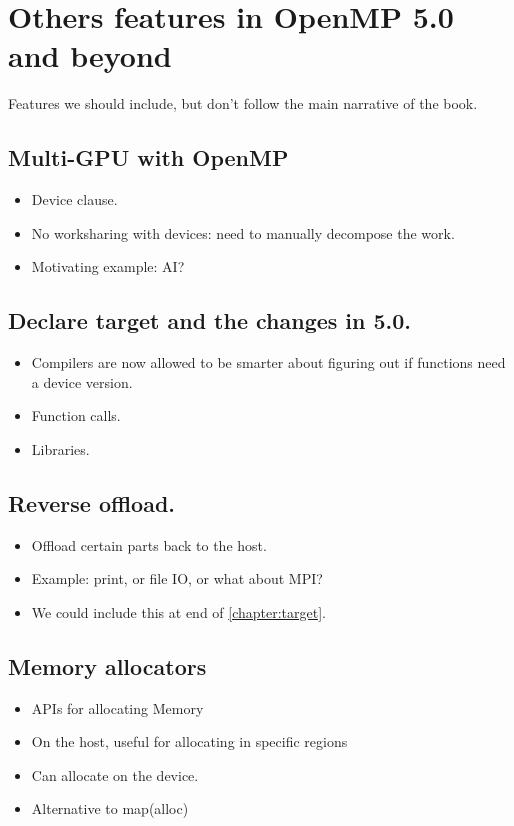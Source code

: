 
\def\ArtDir{08.Future/figures}
\def\SubDir{Text}

\chapter{Others features in OpenMP 5.0 and beyond}
\label{chapter:future}

Features we should include, but don't follow the main narrative of the book.

\section{Multi-GPU with OpenMP}
\begin{itemize}
    \item Device clause.
    \item No worksharing with devices: need to manually decompose the work.
    \item Motivating example: AI?
\end{itemize}

\section{Declare target and the changes in 5.0.}
\begin{itemize}
    \item Compilers are now allowed to be smarter about figuring out if functions need a device version.
    \item Function calls.
    \item Libraries.
\end{itemize}

\section{Reverse offload.}
\begin{itemize}
    \item Offload certain parts back to the host.
    \item Example: print, or file IO, or what about MPI?
    \item We could include this at end of \ref{chapter:target}.
\end{itemize}

\section{Memory allocators}
\begin{itemize}
    \item APIs for allocating Memory
    \item On the host, useful for allocating in specific regions
    \item Can allocate on the device.
    \item Alternative to map(alloc)
\end{itemize}



